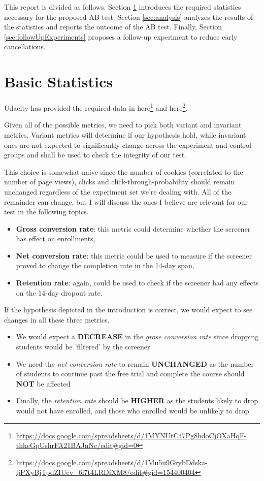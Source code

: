 \documentclass[11pt]{article}
\begin{document}
	This report is divided as follows.
	Section \ref{sec:requiredStatistics} introduces the required statistics necessary for the proposed AB test.
	Section \ref{sec:analysis} analyzes the results of the statistics and reports the outcome of the AB test.
	Finally, Section \ref{sec:followUpExperiments} proposes a follow-up experiment to reduce early cancellations.

\section{Basic Statistics} \label{sec:requiredStatistics}

	Udacity has provided the required data in here\footnote{\url{https://docs.google.com/spreadsheets/d/1MYNUtC47Pg8hdoCjOXaHqF-thheGpUshrFA21BAJnNc/edit#gid=0}} and here\footnote{\url{https://docs.google.com/spreadsheets/d/1Mu5u9GrybDdska-ljPXyBjTpdZIUev_6i7t4LRDfXM8/edit#gid=154400404}}.
	
	Given all of the possible metrics, we need to pick both variant and invariant metrics.
	Variant metrics will determine if our hypothesis hold, while invariant ones are not expected to significantly change across the experiment and control groups and shall be used to check the integrity of our test.
	
	This choice is somewhat naive since the number of cookies (correlated to the number of page views), clicks and click-through-probability should remain unchanged regardless of the experiment set we're dealing with.
	All of the remainder can change, but I will discuss the ones I believe are relevant for our test in the following topics.
	
	\begin{itemize}
		\item \textbf{Gross conversion rate}: this metric could determine whether the screener has effect on enrollments,
		\item \textbf{Net conversion rate}: this metric could be used to measure if the screener proved to change the completion rate in the 14-day span,
		\item \textbf{Retention rate}: again, could be used to check if the screener had any effects on the 14-day dropout rate.
	\end{itemize}
	
	If the hypothesis depicted in the introduction is correct, we would expect to see changes in all these three metrics.
	
	\begin{itemize}
		\item We would expect a \textbf{DECREASE} in the \textit{grose conversion rate} since dropping students would be 'filtered' by the screener
		\item We need the \textit{net conversion rate} to remain \textbf{UNCHANGED} as the number of students to continue past the free trial and complete the course should \textbf{NOT} be affected
		\item Finally, the \textit{retention rate} should be \textbf{HIGHER} as the students likely to drop would not have enrolled, and those who enrolled would be unlikely to drop
	\end{itemize}
	
\end{document}
